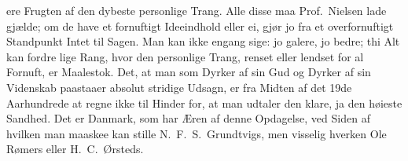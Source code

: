 ere Frugten af den dybeste personlige Trang. Alle disse maa Prof.\
Nielsen lade gjælde; om de have et fornuftigt Ideeindhold eller ei, gjør jo
fra et overfornuftigt Standpunkt Intet til Sagen. Man kan ikke engang sige:
jo galere, jo bedre; thi Alt kan fordre lige Rang, hvor den personlige Trang,
renset eller lendset for al Fornuft, er Maalestok. Det, at man som Dyrker af
sin Gud og Dyrker af sin Videnskab paastaaer absolut stridige Udsagn, er fra
Midten af det 19de Aarhundrede at regne ikke til Hinder for, at man udtaler
den klare, ja den høieste Sandhed. Det er Danmark, som har Æren af denne
Opdagelse, ved Siden af hvilken man maaskee kan stille N.\ F.\ S.\
Grundtvigs, men visselig hverken Ole Rømers eller H.\ C.\ Ørsteds.

